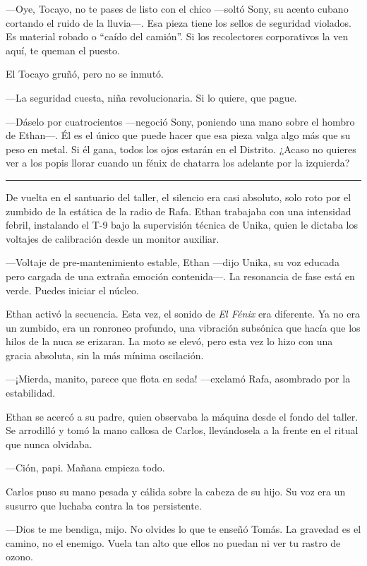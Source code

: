 \documentclass[12pt,a4paper]{book}
\begin{document}
---Oye, Tocayo, no te pases de listo con el chico ---soltó Sony, su acento cubano cortando el ruido de la lluvia---. Esa pieza tiene los sellos de seguridad violados. Es material robado o ``caído del camión''. Si los recolectores corporativos la ven aquí, te queman el puesto.

El Tocayo gruñó, pero no se inmutó.

---La seguridad cuesta, niña revolucionaria. Si lo quiere, que pague.

---Dáselo por cuatrocientos ---negoció Sony, poniendo una mano sobre el hombro de Ethan---. Él es el único que puede hacer que esa pieza valga algo más que su peso en metal. Si él gana, todos los ojos estarán en el Distrito. ¿Acaso no quieres ver a los popis llorar cuando un fénix de chatarra los adelante por la izquierda?

\bigskip
\noindent\rule{\textwidth}{0.4pt}
\bigskip

De vuelta en el santuario del taller, el silencio era casi absoluto, solo roto por el zumbido de la estática de la radio de Rafa. Ethan trabajaba con una intensidad febril, instalando el T-9 bajo la supervisión técnica de Unika, quien le dictaba los voltajes de calibración desde un monitor auxiliar.

---Voltaje de pre-mantenimiento estable, Ethan ---dijo Unika, su voz educada pero cargada de una extraña emoción contenida---. La resonancia de fase está en verde. Puedes iniciar el núcleo.

Ethan activó la secuencia. Esta vez, el sonido de \textit{El Fénix} era diferente. Ya no era un zumbido, era un ronroneo profundo, una vibración subsónica que hacía que los hilos de la nuca se erizaran. La moto se elevó, pero esta vez lo hizo con una gracia absoluta, sin la más mínima oscilación.

---¡Mierda, manito, parece que flota en seda! ---exclamó Rafa, asombrado por la estabilidad.

Ethan se acercó a su padre, quien observaba la máquina desde el fondo del taller. Se arrodilló y tomó la mano callosa de Carlos, llevándosela a la frente en el ritual que nunca olvidaba.

---Ción, papi. Mañana empieza todo.

Carlos puso su mano pesada y cálida sobre la cabeza de su hijo. Su voz era un susurro que luchaba contra la tos persistente.

---Dios te me bendiga, mijo. No olvides lo que te enseñó Tomás. La gravedad es el camino, no el enemigo. Vuela tan alto que ellos no puedan ni ver tu rastro de ozono.
\end{document}
